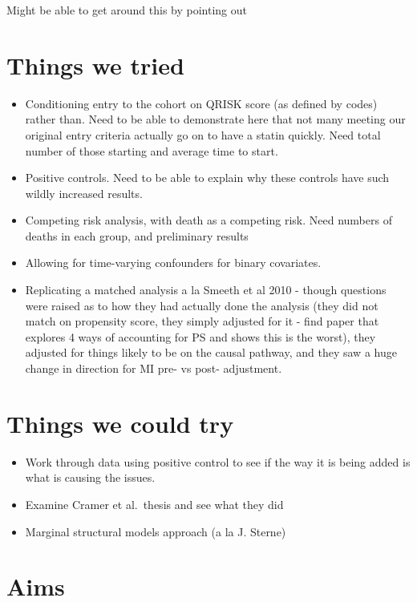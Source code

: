 \documentclass[a4paper, twoside]{templates/ociamthesis}
\providecommand{\tightlist}{%
  \setlength{\itemsep}{0pt}\setlength{\parskip}{0pt}}
\begin{document}
Might be able to get around this by pointing out

\hypertarget{things-we-tried}{%
\section{Things we tried}\label{things-we-tried}}

\begin{itemize}
\tightlist
\item
  Conditioning entry to the cohort on QRISK score (as defined by codes) rather than. Need to be able to demonstrate here that not many meeting our original entry criteria actually go on to have a statin quickly. Need total number of those starting and average time to start.
\item
  Positive controls. Need to be able to explain why these controls have such wildly increased results.
\item
  Competing risk analysis, with death as a competing risk. Need numbers of deaths in each group, and preliminary results
\item
  Allowing for time-varying confounders for binary covariates.
\item
  Replicating a matched analysis a la Smeeth et al 2010 - though questions were raised as to how they had actually done the analysis (they did not match on propensity score, they simply adjusted for it - find paper that explores 4 ways of accounting for PS and shows this is the worst), they adjusted for things likely to be on the causal pathway, and they saw a huge change in direction for MI pre- vs post- adjustment.
\end{itemize}

\hypertarget{things-we-could-try}{%
\section{Things we could try}\label{things-we-could-try}}

\begin{itemize}
\tightlist
\item
  Work through data using positive control to see if the way it is being added is what is causing the issues.
\item
  Examine Cramer et al.~thesis and see what they did
\item
  Marginal structural models approach (a la J. Sterne)
\end{itemize}

\hypertarget{aims-1}{%
\section{Aims}\label{aims-1}}
\end{document}
